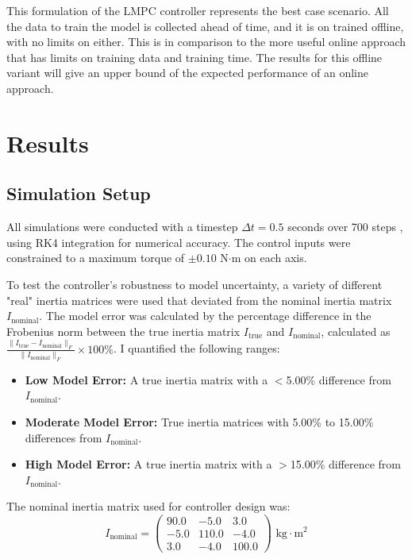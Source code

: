 \documentclass[conference]{IEEEtran}
\begin{document}
This formulation of the LMPC controller represents the best case scenario.
All the data to train the model is collected ahead of time, and it is on 
trained offline, with no limits on either.
This is in comparison to the more useful online approach that has limits on 
training data and training time. The results for this offline 
variant will give an upper bound of the expected performance of an online approach.

\section{Results}

\subsection{Simulation Setup}
All simulations were conducted with a timestep \( \Delta t = 0.5 \) seconds over 700 steps
, using RK4 integration for numerical accuracy. The control inputs were
constrained to a maximum torque of \( \pm 0.10 \) N\( \cdot \)m on
each axis.

To test the controller's robustness to model uncertainty,
a variety of different "real" inertia matrices were used that deviated
from the nominal inertia matrix \( I_{\text{nominal}} \). The model
error was calculated by the percentage difference in the Frobenius
norm between the true inertia matrix \( I_{\text{true}} \) and
\( I_{\text{nominal}} \), calculated as
\( \frac{\|I_{\text{true}} - I_{\text{nominal}}\|_F}{\|I_{\text{nominal}}\|_F} \times 100\% \).
I quantified the following ranges:
\begin{itemize}
    \item \textbf{Low Model Error:} A true inertia matrix with a $<$5.00\%
    difference from \( I_{\text{nominal}} \).
    \item \textbf{Moderate Model Error:} True inertia matrices with 5.00\%
    to 15.00\% differences from \( I_{\text{nominal}} \).
    \item \textbf{High Model Error:} A true inertia matrix with a $>$15.00\%
    difference from \( I_{\text{nominal}} \).
\end{itemize}
The nominal inertia matrix used for controller design was:
\[
I_{\text{nominal}} = \begin{pmatrix}
90.0 & -5.0 & 3.0 \\
-5.0 & 110.0 & -4.0 \\
3.0 & -4.0 & 100.0
\end{pmatrix} \text{ kg}\cdot\text{m}^2
\]
\end{document}
